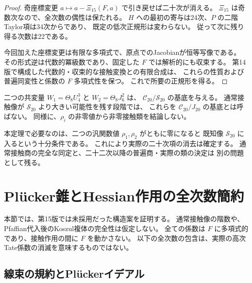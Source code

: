 \begin{proof}
奇座標変更 $a\mapsto a-\Xi_{15}(F,a)$ で引き戻せば二十次が消える。
$\Xi_{15}$ は奇数次なので、全次数の偶性は保たれる。
$H$ への最初の寄与は24次、$P$ の二階Taylor項は34次からであり、
既定の低次正規形は変わらない。
従って次に残り得る次数は22である。

今回加えた座標変更は有限な多項式で、原点でのJacobianが恒等写像である。
その形式逆は代数的冪級数であり、固定した $F$ では解析的にも収束する。
第14版で構成した代数的・収束的な接触変換との有限合成は、
これらの性質および普遍同変性と係数の $F$ 多項式性を保つ。
これで所要の正規形を得る。
\end{proof}

\begin{remark}[通常商の同定との区別]
二つの共変量 $W_1=\Theta_8U_4^3$ と $W_2=\Theta_8J_6^2$ は、
$\mathcal C_{20}/\mathcal S_{20}$ の基底を与える。
通常接触像が $\mathcal S_{20}$ より大きい可能性を残す段階では、
これらを $\mathcal C_{20}/J_{20}$ の基底とは呼ばない。
同様に、$\rho_i$ の非零値から非零接触類を結論しない。

本定理で必要なのは、二つの汎関数値 $\rho_1,\rho_2$ がともに零になると
既知像 $\mathcal S_{20}$ に入るという十分条件である。
これにより実際の二十次項の消去は確定する。
通常接触商の完全な同定と、二十二次以降の普遍商・実際の類の決定は
別の問題として残る。
\end{remark}


\clearpage

\section{Pl\"ucker錐とHessian作用の全次数簡約}
\label{sec:v16-plucker-hessian-structure}

本節では、第15版では未採用だった構造案を証明する。
通常接触像の階数や、Pfaffian代入後のKoszul複体の完全性は仮定しない。
全ての係数は $F$ に多項式的であり、接触作用の間に $F$ を動かさない。
以下の全次数の包含は、実際の高次Tate係数の消滅を意味するものではない。

\subsection{線束の規約とPl\"uckerイデアル}

